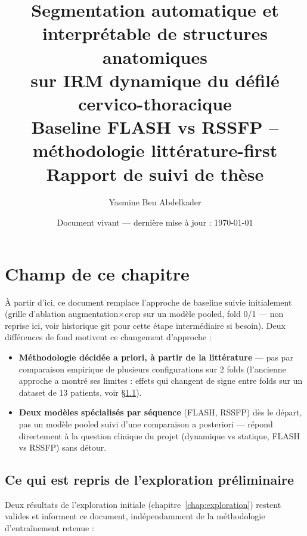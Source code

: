 \documentclass[11pt,a4paper]{report}
\title{Segmentation automatique et interprétable de structures anatomiques \\
sur IRM dynamique du défilé cervico-thoracique \\
\large Baseline FLASH vs RSSFP -- méthodologie littérature-first \\
\large Rapport de suivi de thèse}
\author{Yasmine Ben Abdelkader}
\date{Document vivant --- dernière mise à jour : \today}
\begin{document}
\maketitle
\tableofcontents






\chapter{Champ de ce chapitre}

À partir d'ici, ce document remplace l'approche de baseline suivie initialement
(grille d'ablation augmentation$\times$crop sur un modèle pooled, fold 0/1 --- non
reprise ici, voir historique git pour cette étape intermédiaire si besoin). Deux
différences de fond motivent ce changement d'approche :

\begin{itemize}[nosep]
    \item \textbf{Méthodologie décidée a priori, à partir de la littérature} --- pas
        par comparaison empirique de plusieurs configurations sur 2 folds (l'ancienne
        approche a montré ses limites : effets qui changent de signe entre folds sur
        un dataset de 13 patients, voir \S\ref{sec:limite-ancienne-approche}).
    \item \textbf{Deux modèles spécialisés par séquence} (FLASH, RSSFP) dès le
        départ, pas un modèle pooled suivi d'une comparaison a posteriori --- répond
        directement à la question clinique du projet (dynamique vs statique,
        FLASH vs RSSFP) sans détour.
\end{itemize}

\section{Ce qui est repris de l'exploration préliminaire}
\label{sec:limite-ancienne-approche}

Deux résultats de l'exploration initiale (chapitre~\ref{chap:exploration}) restent
valides et informent ce document, indépendamment de la méthodologie d'entraînement
retenue :
\end{document}
